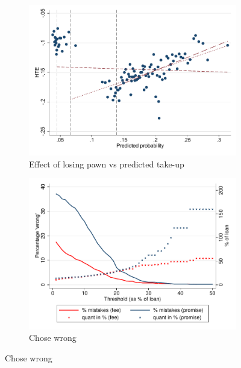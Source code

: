 \documentclass[11pt]{article}
\begin{document}
\begin{figure}[H]
    \caption{Who makes mistakes?}
    \label{choose_wrong}
    \begin{center}
    \begin{subfigure}{0.4\textwidth}
        \caption{\footnotesize{Effect of losing pawn vs predicted take-up}}
        \centering
        \includegraphics[width=\textwidth]{Figuras/takeuppr_def.pdf}
    \end{subfigure}
        \begin{subfigure}{0.5\textwidth}
        \caption{\footnotesize{Chose wrong}}
        \centering
        \includegraphics[width=\textwidth]{Figuras/line_cw_pw_fc_te_cf.pdf}
    \end{subfigure}
    \end{center}

\end{figure}
\end{document}
